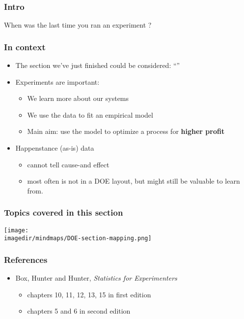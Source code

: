 \begin{frame}\frametitle{Intro}
	\begin{exampleblock}{}
		{\Huge When was the last time you ran an experiment ?}
	\end{exampleblock}
\end{frame}

\begin{frame}\frametitle{In context}
	\begin{itemize}
		\item	The section we've just finished could be considered: ``{\color{myOrange}{Empirical modelling of systems using a least squares model}}''
		
		\vspace{12pt}
		\item	Experiments are important:
		\begin{itemize}
			\item	We learn more about our systems
			\item	We use the data to fit an empirical model
			\item	Main aim: use the model to optimize a process for \textbf{higher profit}
		\end{itemize}
		
		\vspace{12pt}
		\item	Happenstance (as-is) data 
		\begin{itemize}
			\item	cannot tell cause-and effect
			\item	most often is not in a DOE layout, but might still be valuable to learn from.
		\end{itemize}
	\end{itemize}
\end{frame}

\begin{frame}\frametitle{Topics covered in this section}
	\begin{center}
		\texttt{[image: \\imagedir/mindmaps/DOE-section-mapping.png]}
	\end{center}
\end{frame}

\begin{frame}\frametitle{References}
	\begin{itemize}
		\item	Box, Hunter and Hunter, \emph{Statistics for Experimenters}
		\begin{itemize}
			\item	chapters 10, 11, 12, 13, 15 in first edition
			\item	chapters 5 and 6 in second edition
		\end{itemize}
	\end{itemize}
\end{frame}

